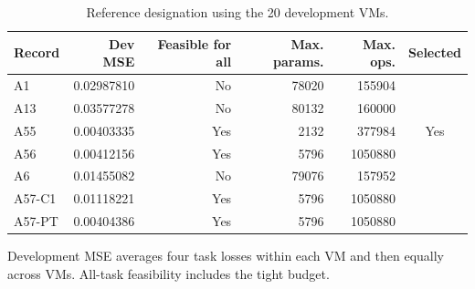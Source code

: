 \begin{table}[pos=!htbp]
\centering\footnotesize
\caption{Reference designation using the 20 development VMs.}\label{tab:s-reference}
\begin{tabular}{lrrrrc}
\toprule
Record & Dev MSE & Feasible for all & Max. params. & Max. ops. & Selected\\\midrule
A1 & 0.02987810 & No & 78020 & 155904 & \\
A13 & 0.03577278 & No & 80132 & 160000 & \\
A55 & 0.00403335 & Yes & 2132 & 377984 & Yes\\
A56 & 0.00412156 & Yes & 5796 & 1050880 & \\
A6 & 0.01455082 & No & 79076 & 157952 & \\
A57-C1 & 0.01118221 & Yes & 5796 & 1050880 & \\
A57-PT & 0.00404386 & Yes & 5796 & 1050880 & \\
\bottomrule
\end{tabular}
\par\vspace{3pt}\begin{minipage}{\linewidth}\footnotesize Development MSE averages four task losses within each VM and then equally across VMs. All-task feasibility includes the tight budget.\end{minipage}
\end{table}
